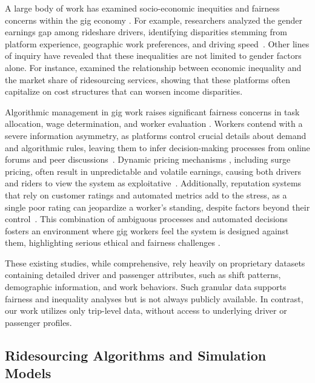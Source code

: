 A large body of work has examined socio-economic inequities and fairness concerns within the gig economy \cite{de2015rise, wood2019good, berg2015income}. For example, researchers analyzed the gender earnings gap among rideshare drivers, identifying disparities stemming from platform experience, geographic work preferences, and driving speed~\cite{cook2021gender}. Other lines of inquiry have revealed that these inequalities are not limited to gender factors alone. For instance, \cite{de2024ridesourcing} examined the relationship between economic inequality and the market share of ridesourcing services, showing that these platforms often capitalize on cost structures that can worsen income disparities.

Algorithmic management in gig work raises significant fairness concerns in task allocation, wage determination, and worker evaluation \cite{zhang2022algorithmic, duggan2020algorithmic, kadolkar2024algorithmic}. Workers contend with a severe information asymmetry, as platforms control crucial details about demand and algorithmic rules, leaving them to infer decision-making processes from online forums and peer discussions~\cite{rosenblat2016algorithmic}. Dynamic pricing mechanisms \cite{shapiro2020dynamic, van2020wage}, including surge pricing, often result in unpredictable and volatile earnings, causing both drivers and riders to view the system as exploitative~\cite{cramer2016disruptive}. Additionally, reputation systems that rely on customer ratings and automated metrics add to the stress, as a single poor rating can jeopardize a worker’s standing, despite factors beyond their control~\cite{lee2015working, rosenblat2018uberland}. This combination of ambiguous processes and automated decisions fosters an environment where gig workers feel the system is designed against them, highlighting serious ethical and fairness challenges \cite{wood2019good}.


These existing studies, while comprehensive, rely heavily on proprietary datasets containing detailed driver and passenger attributes, such as shift patterns, demographic information, and work behaviors. Such granular data supports fairness and inequality analyses but is not always publicly available. In contrast, our work utilizes only trip-level data, without access to underlying driver or passenger profiles.

\subsection{Ridesourcing Algorithms and Simulation Models}

